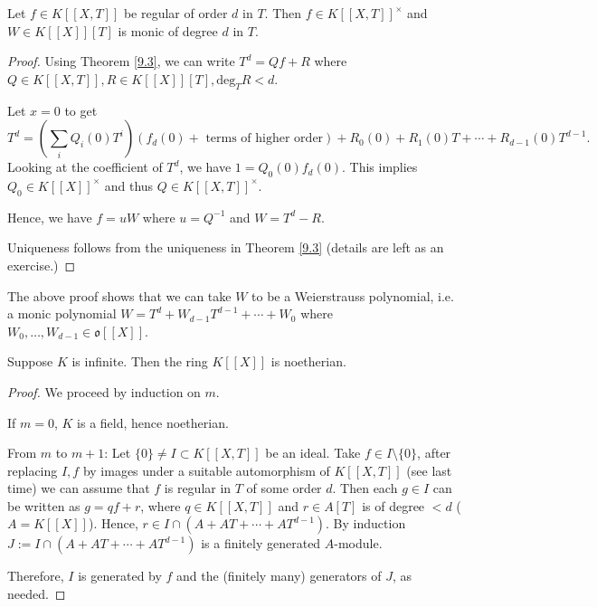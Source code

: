 
\begin{corollary} %

Let $f\in K[[X,T]]$ be regular of order $d$ in $T$.
Then $f\in K[[X,T]]^\times$ and $W\in K[[X]][T]$ is monic of degree $d$ in $T$.
 \end{corollary}

\begin{proof} %

Using Theorem \ref{9.3}, we can write $T^d = Qf+R$ where $Q\in K[[X,T]], R\in K[[X]][T], \mathrm{deg}_TR < d$.

Let $x=0$ to get
$$T^d = \left( \sum_i Q_i(0) T^i \right) (f_d(0) + \textrm{ terms of higher order} )
+ R_0(0) + R_1(0) T + \cdots + R_{d-1}(0) T^{d-1}.$$
Looking at the coefficient of $T^d$, we have $1 = Q_0(0) f_d(0)$.
This implies $Q_0 \in K[[X]]^\times$ and thus $Q\in K[[X,T]]^\times$.

Hence, we have $f = uW$ where $u = Q^{-1}$ and $W = T^d - R$.

Uniqueness follows from the uniqueness in Theorem \ref{9.3} (details are left as an exercise.)
 \end{proof}

\begin{remark}
The above proof shows that we can take $W$ to be a Weierstrauss polynomial, i.e. a monic polynomial
$W = T^d + W_{d-1} T^{d-1} + \cdots + W_0$ where $W_0,\ldots, W_{d-1}\in \mathfrak{o}[[X]]$.
\end{remark}

\begin{corollary} %
Suppose $K$ is infinite. Then the ring $K[[X]]$ is noetherian.
 \end{corollary}

\begin{proof} %
We proceed by induction on $m$.

If $m=0$, $K$ is a field, hence noetherian.

From $m$ to $m+1$:
Let $\{0\} \neq I \subset K[[X,T]]$ be an ideal.
Take $f\in I\setminus \{0\}$, after replacing $I,f$ by images under a suitable automorphism of $K[[X,T]]$
(see last time) we can assume that $f$ is regular in $T$ of some order $d$.
Then each $g\in I$ can be written as $g = qf + r$, where $q\in K[[X,T]]$ and $r\in A[T]$ is of degree $<d$ ($A = K[[X]]$).
Hence, $r\in I \cap (A + AT + \cdots + AT^{d-1})$. By induction $J:= I\cap (A + AT + \cdots + AT^{d-1})$ is a finitely generated $A$-module.

Therefore, $I$ is generated by $f$ and the (finitely many) generators of $J$, as needed.
 \end{proof}

